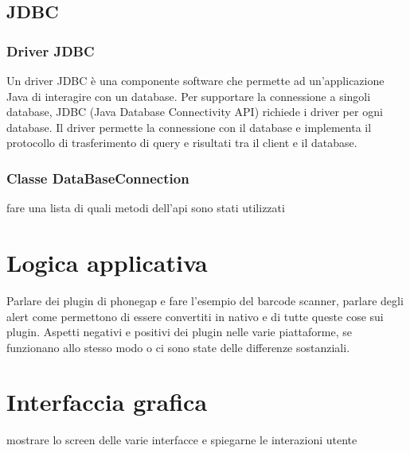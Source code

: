 \subsection{JDBC}

\subsubsection{Driver JDBC}

Un driver JDBC è una componente software che permette ad un'applicazione Java di interagire con un database. Per supportare la connessione a singoli database, JDBC (Java Database Connectivity API) richiede i driver per ogni database. Il driver permette la connessione con il database e implementa il protocollo di trasferimento di query e risultati tra il client e il database.

\subsubsection{Classe DataBaseConnection}

fare una lista di quali metodi dell'api sono stati utilizzati

\section{Logica applicativa}

Parlare dei plugin di phonegap e fare l'esempio del barcode scanner, parlare degli alert come permettono di essere convertiti in nativo e di tutte queste cose sui plugin. Aspetti negativi e positivi dei plugin nelle varie piattaforme, se funzionano allo stesso modo o ci sono state delle differenze sostanziali.

\section{Interfaccia grafica}

mostrare lo screen delle varie interfacce e spiegarne le interazioni utente
